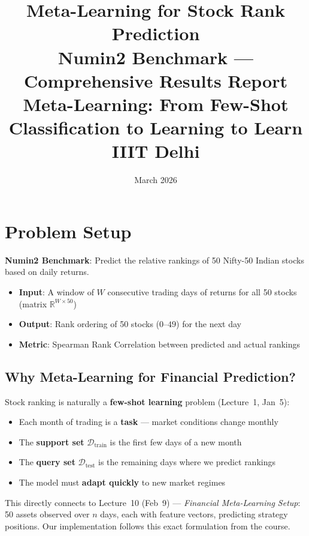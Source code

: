 \documentclass[11pt,a4paper]{article}
\title{\textbf{\LARGE Meta-Learning for Stock Rank Prediction}\\[6pt]
\Large Numin2 Benchmark --- Comprehensive Results Report\\[12pt]
\large Meta-Learning: From Few-Shot Classification to Learning to Learn\\
IIIT Delhi}
\author{}
\date{March 2026}
\begin{document}
\maketitle
\thispagestyle{fancy}

\section{Problem Setup}

\textbf{Numin2 Benchmark}: Predict the relative rankings of 50 Nifty-50 Indian stocks based on daily returns.

\begin{itemize}[nosep]
    \item \textbf{Input}: A window of $W$ consecutive trading days of returns for all 50 stocks (matrix $\mathbb{R}^{W \times 50}$)
    \item \textbf{Output}: Rank ordering of 50 stocks ($0$--$49$) for the next day
    \item \textbf{Metric}: Spearman Rank Correlation between predicted and actual rankings
\end{itemize}

\subsection{Why Meta-Learning for Financial Prediction?}

Stock ranking is naturally a \textbf{few-shot learning} problem (Lecture~1, Jan~5):
\begin{itemize}[nosep]
    \item Each month of trading is a \textbf{task} --- market conditions change monthly
    \item The \textbf{support set} $\mathcal{D}_{\text{train}}$ is the first few days of a new month
    \item The \textbf{query set} $\mathcal{D}_{\text{test}}$ is the remaining days where we predict rankings
    \item The model must \textbf{adapt quickly} to new market regimes
\end{itemize}

This directly connects to Lecture~10 (Feb~9) --- \emph{Financial Meta-Learning Setup}: 50 assets observed over $n$ days, each with feature vectors, predicting strategy positions. Our implementation follows this exact formulation from the course.

\end{document}
